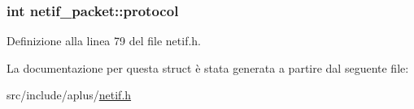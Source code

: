 \hypertarget{structnetif__packet_a2517358f8125e0a674a0628a77f1095d}{
\subsubsection[{protocol}]{\setlength{\rightskip}{0pt plus 5cm}int netif\+\_\+packet\+::protocol}}\label{structnetif__packet_a2517358f8125e0a674a0628a77f1095d}


Definizione alla linea 79 del file netif.\+h.



La documentazione per questa struct è stata generata a partire dal seguente file\+:\begin{DoxyCompactItemize}
\item 
src/include/aplus/\hyperlink{netif_8h}{netif.\+h}\end{DoxyCompactItemize}
